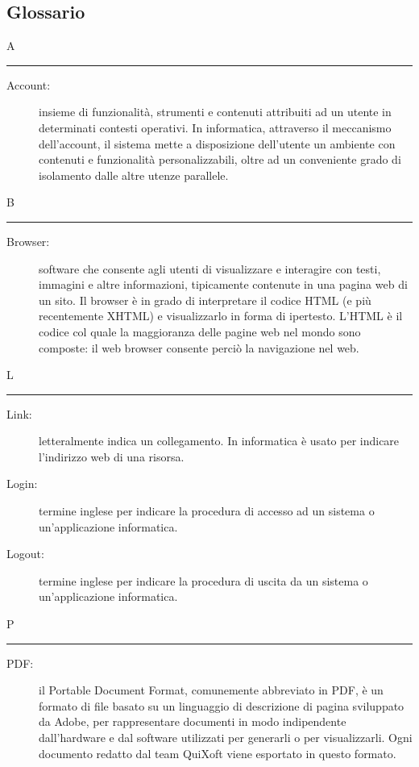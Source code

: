 \documentclass[11pt,a4paper]{article}
\begin{document}
\subsection{Glossario}
\flushleft \Huge A \bigskip
\hrule
\smallskip
\normalsize
\begin{description}
	\item[Account:] insieme di funzionalità, strumenti e contenuti attribuiti ad un utente in determinati contesti operativi. In informatica, attraverso il meccanismo dell'account, il sistema mette a disposizione dell'utente un ambiente con contenuti e funzionalità personalizzabili, oltre ad un conveniente grado di isolamento dalle altre utenze parallele.
\end{description}
\bigskip
\Huge B \bigskip
\hrule
\smallskip
\normalsize
\begin{description}
	\item[Browser:] software che consente agli utenti di visualizzare e interagire con testi, immagini e altre informazioni, tipicamente contenute in una pagina web di un sito. Il browser è in grado di interpretare il codice HTML (e più recentemente XHTML) e visualizzarlo in forma di ipertesto. L'HTML è il codice col quale la maggioranza delle pagine web nel mondo sono composte: il web browser consente perciò la navigazione nel web.
\end{description}
\bigskip
\Huge L \bigskip
\hrule
\smallskip
\normalsize
\begin{description}
	\item[Link:] letteralmente indica un collegamento. In informatica è usato per indicare l'indirizzo web di una risorsa.
	\item[Login:] termine inglese per indicare la procedura di accesso ad un sistema o un'applicazione informatica.
	\item[Logout:] termine inglese per indicare la procedura di uscita da un sistema o un'applicazione informatica.
\end{description}
\bigskip
\Huge P \bigskip
\hrule
\smallskip
\normalsize
\begin{description}
	\item[PDF:] il Portable Document Format, comunemente abbreviato in PDF, è un formato di file basato su un linguaggio di descrizione di pagina sviluppato da Adobe, per rappresentare documenti in modo indipendente dall'hardware e dal software utilizzati per generarli o per visualizzarli. Ogni documento redatto dal team QuiXoft viene esportato in questo formato.
\end{description}
\end{document}
